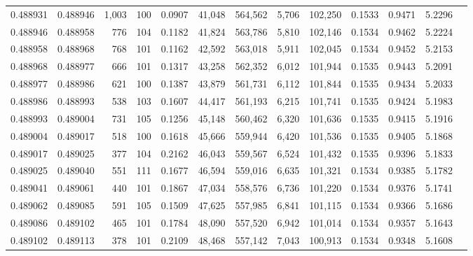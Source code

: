\begin{tabular}{rrrrrrrrrrrrr}
0.488931 & 0.488946 & 1,003 & 100 &                                     0.0907 &  41,048 & 564,562 &   5,706 & 102,250 & 0.1533 & 0.9471 & 5.2296 \\
0.488946 & 0.488958 &   776 & 104 &                                     0.1182 &  41,824 & 563,786 &   5,810 & 102,146 & 0.1534 & 0.9462 & 5.2224 \\
0.488958 & 0.488968 &   768 & 101 &                                     0.1162 &  42,592 & 563,018 &   5,911 & 102,045 & 0.1534 & 0.9452 & 5.2153 \\
0.488968 & 0.488977 &   666 & 101 &                                     0.1317 &  43,258 & 562,352 &   6,012 & 101,944 & 0.1535 & 0.9443 & 5.2091 \\
0.488977 & 0.488986 &   621 & 100 &                                     0.1387 &  43,879 & 561,731 &   6,112 & 101,844 & 0.1535 & 0.9434 & 5.2033 \\
0.488986 & 0.488993 &   538 & 103 &                                     0.1607 &  44,417 & 561,193 &   6,215 & 101,741 & 0.1535 & 0.9424 & 5.1983 \\
0.488993 & 0.489004 &   731 & 105 &                                     0.1256 &  45,148 & 560,462 &   6,320 & 101,636 & 0.1535 & 0.9415 & 5.1916 \\
0.489004 & 0.489017 &   518 & 100 &                                     0.1618 &  45,666 & 559,944 &   6,420 & 101,536 & 0.1535 & 0.9405 & 5.1868 \\
0.489017 & 0.489025 &   377 & 104 &                                     0.2162 &  46,043 & 559,567 &   6,524 & 101,432 & 0.1535 & 0.9396 & 5.1833 \\
0.489025 & 0.489040 &   551 & 111 &                                     0.1677 &  46,594 & 559,016 &   6,635 & 101,321 & 0.1534 & 0.9385 & 5.1782 \\
0.489041 & 0.489061 &   440 & 101 &                                     0.1867 &  47,034 & 558,576 &   6,736 & 101,220 & 0.1534 & 0.9376 & 5.1741 \\
0.489062 & 0.489085 &   591 & 105 &                                     0.1509 &  47,625 & 557,985 &   6,841 & 101,115 & 0.1534 & 0.9366 & 5.1686 \\
0.489086 & 0.489102 &   465 & 101 &                                     0.1784 &  48,090 & 557,520 &   6,942 & 101,014 & 0.1534 & 0.9357 & 5.1643 \\
0.489102 & 0.489113 &   378 & 101 &                                     0.2109 &  48,468 & 557,142 &   7,043 & 100,913 & 0.1534 & 0.9348 & 5.1608 \\

\end{tabular}
